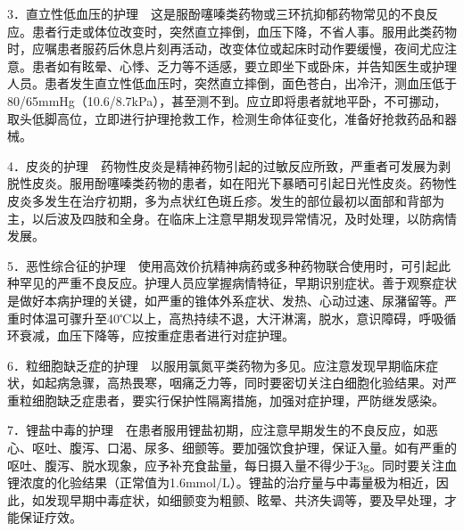 3．直立性低血压的护理　这是服酚噻嗪类药物或三环抗抑郁药物常见的不良反应。患者行走或体位改变时，突然直立摔倒，血压下降，不省人事。服用此类药物时，应嘱患者服药后休息片刻再活动，改变体位或起床时动作要缓慢，夜间尤应注意。患者如有眩晕、心悸、乏力等不适感，要立即坐下或卧床，并告知医生或护理人员。患者发生直立性低血压时，突然直立摔倒，面色苍白，出冷汗，测血压低于80/65mmHg（10.6/8.7kPa），甚至测不到。应立即将患者就地平卧，不可挪动，取头低脚高位，立即进行护理抢救工作，检测生命体征变化，准备好抢救药品和器械。

4．皮炎的护理　药物性皮炎是精神药物引起的过敏反应所致，严重者可发展为剥脱性皮炎。服用酚噻嗪类药物的患者，如在阳光下暴晒可引起日光性皮炎。药物性皮炎多发生在治疗初期，多为点状红色斑丘疹。发生的部位最初以面部和背部为主，以后波及四肢和全身。在临床上注意早期发现异常情况，及时处理，以防病情发展。

5．恶性综合征的护理　使用高效价抗精神病药或多种药物联合使用时，可引起此种罕见的严重不良反应。护理人员应掌握病情特征，早期识别症状。善于观察症状是做好本病护理的关键，如严重的锥体外系症状、发热、心动过速、尿潴留等。严重时体温可骤升至40℃以上，高热持续不退，大汗淋漓，脱水，意识障碍，呼吸循环衰减，血压下降等，应按重症患者进行对症护理。

6．粒细胞缺乏症的护理　以服用氯氮平类药物为多见。应注意发现早期临床症状，如起病急骤，高热畏寒，咽痛乏力等，同时要密切关注白细胞化验结果。对严重粒细胞缺乏症患者，要实行保护性隔离措施，加强对症护理，严防继发感染。

7．锂盐中毒的护理　在患者服用锂盐初期，应注意早期发生的不良反应，如恶心、呕吐、腹泻、口渴、尿多、细颤等。要加强饮食护理，保证入量。如有严重的呕吐、腹泻、脱水现象，应予补充食盐量，每日摄入量不得少于3g。同时要关注血锂浓度的化验结果（正常值为1.6mmol/L）。锂盐的治疗量与中毒量极为相近，因此，如发现早期中毒症状，如细颤变为粗颤、眩晕、共济失调等，要及早处理，才能保证疗效。